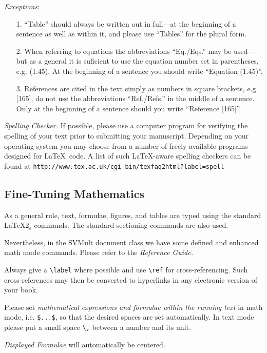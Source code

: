 \documentclass[graybox]{svmult}
\begin{document}
\begin{refguide}
\begin{sloppy}
{\it Exceptions}:
\begin{enumerate}
\item[1.] ``Table'' should always be written out in full---at the beginning of a sentence as well as within it, and please use ``Tables'' for the plural form.
\item[2.] When referring to equations the abbreviations ``Eq./Eqs.'' may be used---but as a general it is suficient to use the equation number set in parenthe­ses, e.g. (1.45). At the beginning of a sentence you should write ``Equation (1.45)''.
\item[3.] References are cited in the text simply as numbers in square brackets, e.g. [165], do not use the abbreviations ``Ref./Refs.'' in the middle of a sentence. Only at the beginning of a sentence should you write ``Reference [165]''.
\end{enumerate}

{\it Spelling Checker.} If possible, please use a computer program for verifying the spelling of your text prior to submitting your manuscript. Depending on your operating system you may choose from a number of freely available programs designed for \LaTeX~code. A list of such \LaTeX-aware spelling checkers can be found at {\tt http://www.tex.ac.uk/cgi-bin/texfaq2html?label=spell}

\subsection{Fine-Tuning Mathematics}
 As a general rule, text, formulae, figures, and tables are typed using the standard \LaTeX2$_\varepsilon$ commands. The standard sectioning commands are also used.

\pagebreak

Nevertheless, in the {\sc SVMult} document class we have some defined and enhanced math mode commands. Please refer to the {\it Reference Guide.}

Always give a \verb|\label| where possible and use \verb|\ref| for cross-referencing. Such cross-references may then be converted to hyperlinks in any electronic version of your book.

Please set {\it mathematical expressions and formulae within the running text} in math mode, i.e. \verb|$...$|, so that the desired spaces are set automatically. In text mode please put a small space \verb|\,| between a number and its unit.

{\it Displayed Formulae} will automatically be centered.


\end{sloppy}
\end{refguide}
\end{document}
